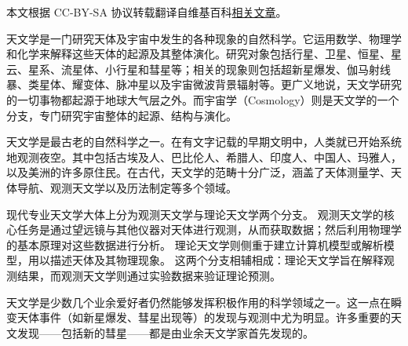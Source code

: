 
本文根据 CC-BY-SA 协议转载翻译自维基百科\href{https://en.wikipedia.org/wiki/Astronomy?utm_source=chatgpt.com}{相关文章}。

天文学是一门研究天体及宇宙中发生的各种现象的自然科学。它运用数学、物理学和化学来解释这些天体的起源及其整体演化。研究对象包括行星、卫星、恒星、星云、星系、流星体、小行星和彗星等；相关的现象则包括超新星爆发、伽马射线暴、类星体、耀变体、脉冲星以及宇宙微波背景辐射等。更广义地说，天文学研究的一切事物都起源于地球大气层之外。而宇宙学（Cosmology）则是天文学的一个分支，专门研究宇宙整体的起源、结构与演化。

天文学是最古老的自然科学之一。在有文字记载的早期文明中，人类就已开始系统地观测夜空。其中包括古埃及人、巴比伦人、希腊人、印度人、中国人、玛雅人，以及美洲的许多原住民。在古代，天文学的范畴十分广泛，涵盖了天体测量学、天体导航、观测天文学以及历法制定等多个领域。

现代专业天文学大体上分为观测天文学与理论天文学两个分支。  
观测天文学的核心任务是通过望远镜与其他仪器对天体进行观测，从而获取数据；然后利用物理学的基本原理对这些数据进行分析。  
理论天文学则侧重于建立计算机模型或解析模型，用以描述天体及其物理现象。  
这两个分支相辅相成：理论天文学旨在解释观测结果，而观测天文学则通过实验数据来验证理论预测。

天文学是少数几个业余爱好者仍然能够发挥积极作用的科学领域之一。这一点在瞬变天体事件（如新星爆发、彗星出现等）的发现与观测中尤为明显。许多重要的天文发现——包括新的彗星——都是由业余天文学家首先发现的。


